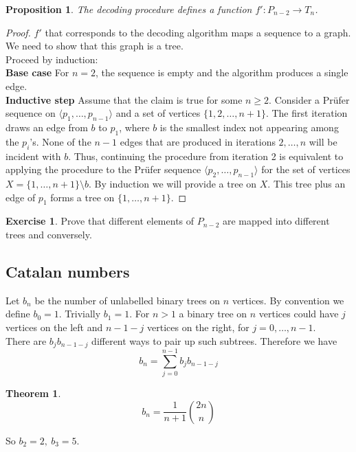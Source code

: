\documentclass{article}
\newtheorem*{thm}{Theorem}
\newtheorem*{prop}{Proposition}
\theoremstyle{definition}
\newtheorem*{exer}{Exercise}
\begin{document}
\begin{prop}
The decoding procedure defines a function $f'\colon P_{n-2} \to T_n$.
\end{prop}

\begin{proof}
$f'$ that corresponds to the decoding algorithm maps a sequence to a graph.
We need to show that this graph is a tree. \\
Proceed by induction: \\
\textbf{Base case} For $n=2$, the sequence is empty and the algorithm produces a single edge. \\
\textbf{Inductive step} Assume that the claim is true for some $n\ge 2$.
Consider a Pr\"ufer sequence on $\langle p_1,\ldots,p_{n-1}\rangle$ and a set of vertices $\{1,2,\ldots,n+1\}$.
The first iteration draws an edge from $b$ to $p_1$, where $b$ is the smallest index not appearing among the $p_i$'s.
None of the $n-1$ edges that are produced in iterations $2,\ldots,n$ will be incident with $b$.
Thus, continuing the procedure from iteration 2 is equivalent to applying the procedure to the Pr\"ufer sequence $\langle p_2,\ldots,p_{n-1}\rangle$ for the set of vertices $X = \{1,\ldots,n+1\}\setminus b$.
By induction we will provide a tree on $X$.
This tree plus an edge of $p_1$ forms a tree on $\{1,\ldots,n+1\}$.
\end{proof}

\begin{exer}
Prove that different elements of $P_{n-2}$ are mapped into different trees and conversely.
\end{exer}

\subsection{Catalan numbers}

Let $b_n$ be the number of unlabelled binary trees on $n$ vertices.
By convention we define $b_0 = 1$.
Trivially $b_1 = 1$.
For $n>1$ a binary tree on $n$ vertices could have $j$ vertices on the left and $n-1-j$ vertices on the right, for $j=0,\ldots,n-1$. \\
There are $b_jb_{n-1-j}$ different ways to pair up such subtrees.
Therefore we have
$$b_n =\sum_{j=0}^{n-1} b_jb_{n-1-j}$$

\begin{thm}
$$b_n = \frac{1}{n+1}\binom{2n}{n}$$
\end{thm}

So $b_2=2,\ b_3=5$.
\end{document}
